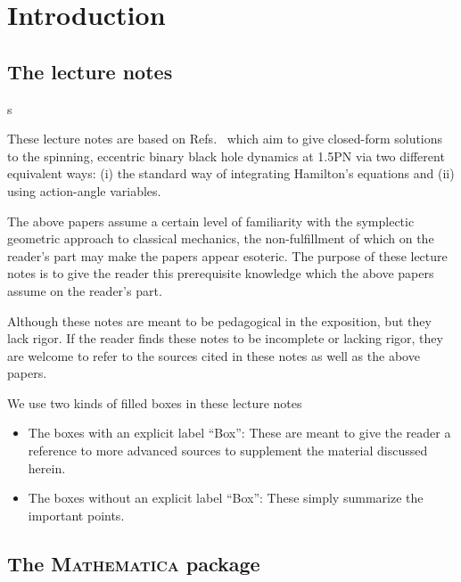 \chapter{Introduction}


\section{The lecture notes}



s


These lecture notes are based on Refs.~\cite{tanay2021action, tanay2021integrability, Cho:2019brd}
 which aim to give closed-form solutions to the spinning, eccentric
binary black hole dynamics at 1.5PN via two different equivalent ways: (i)
the standard way of integrating Hamilton's equations and (ii) using action-angle variables.



The above papers assume a certain level of familiarity
with the symplectic geometric approach to classical mechanics, the non-fulfillment
of which on the reader's part may make the papers appear esoteric.
The purpose of these lecture notes is to give the reader this prerequisite
 knowledge which the above papers assume on the reader's part. 

Although these notes are meant to be pedagogical 
in the exposition, but they
lack rigor. If the reader 
finds these notes to be incomplete or lacking rigor, they are welcome to
refer to the sources cited in these notes as well as the above papers.



We use two kinds of filled boxes in these lecture notes
\begin{itemize}
\item The boxes with an explicit label ``Box'': These are meant
to give the reader a reference to more advanced sources to supplement
the material discussed herein. 
\item The boxes without an explicit label ``Box'': These simply 
summarize the important points.
\end{itemize}


\section{The \textsc{Mathematica} package}

